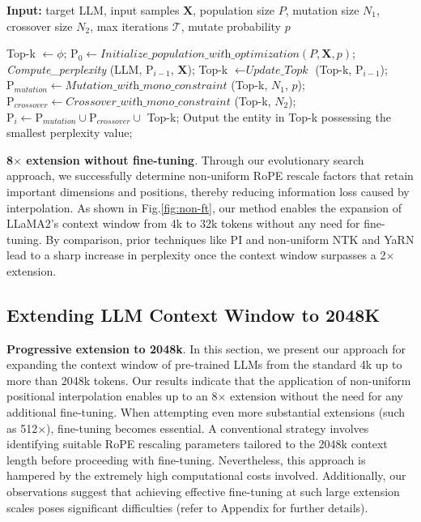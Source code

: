\begin{algorithm}[t]
	\small
	\caption{The search algorithm}
	\textbf{Input:} target LLM, input samples $\mathbf{X}$,   population size $P$, mutation size $N_1$, crossover size $N_2$, max iterations $\mathcal{T}$, mutate probability $p$\\

	\begin{algorithmic}[1]
		\label{alg:search}
		\STATE Top-k $\gets \phi$;	
		\STATE $\text{P}_0 \gets \textit{Initialize\_population\_with\_optimization}(P, \mathbf{X}, p)$; 
		\STATE \textit{Compute\_perplexity} (LLM, $\text{P}_{i-1}$, $\mathbf{X}$);
		\STATE Top-k $\gets \textit{Update\_Topk}$ (Top-k, $\text{P}_{i-1}$);
		\STATE $\text{P}_{mutation} \gets \textit{Mutation\_with\_mono\_constraint}$ (Top-k, $N_1$, $p$); 
		\STATE $\text{P}_{crossover} \gets \textit{Crossover\_with\_mono\_constraint}$ (Top-k, $N_2$);
		\STATE $\text{P}_i \gets \text{P}_{mutation} \cup \text{P}_{crossover} \cup$ Top-k;
		\ENDFOR
		\STATE Output the entity in Top-k possessing the smallest perplexity value;
	\end{algorithmic}
\end{algorithm}

\textbf{8$\times$ extension without fine-tuning}. Through our evolutionary search approach, we successfully determine non-uniform RoPE rescale factors that retain important dimensions and positions, thereby reducing information loss caused by interpolation. As shown in Fig.\ref{fig:non-ft}, our method enables the expansion of LLaMA2’s context window from 4k to 32k tokens without any need for fine-tuning. By comparison, prior techniques like PI and non-uniform NTK and YaRN lead to a sharp increase in perplexity once the context window surpasses a 2$\times$ extension.

\subsection{Extending LLM Context Window to 2048K}
\label{sec:extendto2048k}

\textbf{Progressive extension to 2048k}. In this section, we present our approach for expanding the context window of pre-trained LLMs from the standard 4k up to more than 2048k tokens. Our results indicate that the application of non-uniform positional interpolation enables up to an 8$\times$ extension without the need for any additional fine-tuning. When attempting even more substantial extensions (such as 512$\times$), fine-tuning becomes essential. A conventional strategy involves identifying suitable RoPE rescaling parameters tailored to the 2048k context length before proceeding with fine-tuning. Nevertheless, this approach is hampered by the extremely high computational costs involved. Additionally, our observations suggest that achieving effective fine-tuning at such large extension scales poses significant difficulties (refer to Appendix for further details).

